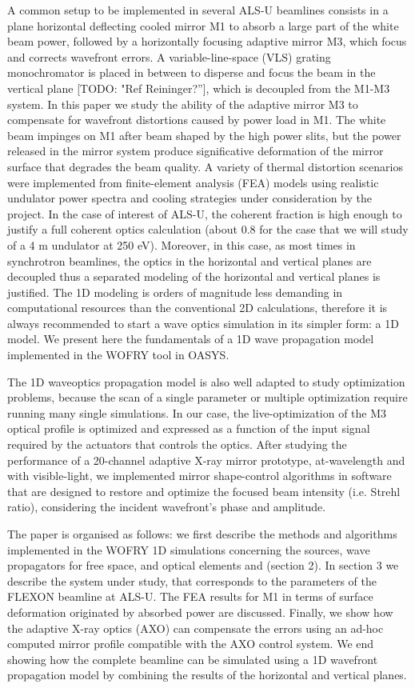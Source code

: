 \documentclass{iucr}              %
\newcommand{\todo}[1]{{\color{red}[TODO: "#1'']}}
\begin{document}
A common setup to be implemented in several ALS-U beamlines consists in a plane horizontal deflecting cooled mirror M1 to absorb a large part of the white beam power, followed by a horizontally focusing adaptive mirror M3, which focus and corrects wavefront errors. A variable-line-space (VLS) grating monochromator is placed in between to disperse and focus the beam in the vertical plane \todo{Ref Reininger?}, which is decoupled from the M1-M3 system. In this paper we study the ability of the adaptive mirror M3 to compensate for wavefront distortions caused by power load in M1. The white beam impinges on M1 after beam shaped by the high power slits, but the power released in the mirror system produce significative deformation of the mirror surface that degrades the beam quality. 
A variety of thermal distortion scenarios were implemented from finite-element analysis (FEA) models using realistic undulator power spectra and cooling strategies under consideration by the project.
In the case of interest of ALS-U, the coherent fraction is high enough  to justify a full coherent optics calculation (about 0.8 for the case that we will study of a 4 m undulator at 250 eV). Moreover, in this case, as most times in synchrotron beamlines, the optics in the horizontal and vertical planes are decoupled thus a separated modeling of the horizontal and vertical planes is justified. The 1D modeling is orders of magnitude less demanding in computational resources than the conventional 2D calculations, therefore it is always recommended to start a wave optics simulation in its simpler form: a 1D model. We present here the fundamentals of a 1D wave propagation model implemented in the WOFRY \cite{codeWOFRY} tool in OASYS. 

The 1D waveoptics propagation model is also well adapted to study optimization problems, because the scan of a single parameter or multiple optimization require running many single simulations. In our case, the live-optimization of the M3 optical profile is optimized and expressed as a function of the input signal required by the actuators that controls the optics. 
After studying the performance of a 20-channel adaptive X-ray mirror prototype, at-wavelength and with visible-light, we implemented mirror shape-control algorithms in software that are designed to restore and optimize the focused beam intensity (i.e. Strehl ratio), considering the incident wavefront’s phase and amplitude.


The paper is organised as follows: we first describe the methods and algorithms implemented in the WOFRY 1D simulations concerning the sources, wave propagators for free space, and optical elements and (section 2). In section 3 we describe the system under study, that corresponds to the parameters of the FLEXON beamline at ALS-U. The FEA results for M1 in terms of surface deformation originated by absorbed power are discussed. Finally, we show how the adaptive X-ray optics (AXO) can compensate the errors using an ad-hoc computed mirror profile compatible with the AXO control system. We end showing how the complete beamline can be simulated using a 1D wavefront propagation model by combining the results of the horizontal and vertical planes.  
\end{document}
